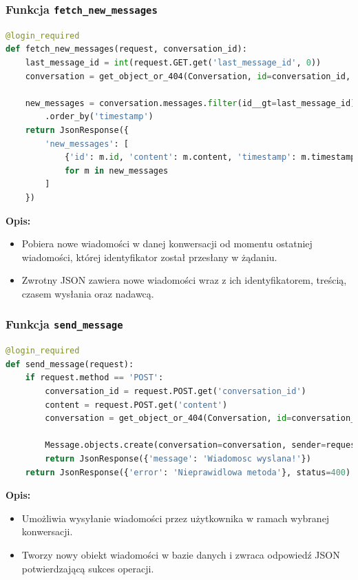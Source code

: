 \documentclass[12pt,a4paper,oneside]{article}
\theoremstyle{definition}
\numberwithin{equation}{section}
\begin{document}
\subsubsection{Funkcja \texttt{fetch\_new\_messages}}
\begin{lstlisting}[language=Python, caption=Funkcja \texttt{fetch\_new\_messages}]
@login_required
def fetch_new_messages(request, conversation_id):
    last_message_id = int(request.GET.get('last_message_id', 0))
    conversation = get_object_or_404(Conversation, id=conversation_id, participants=request.user)

    new_messages = conversation.messages.filter(id__gt=last_message_id)
        .order_by('timestamp')
    return JsonResponse({
        'new_messages': [
            {'id': m.id, 'content': m.content, 'timestamp': m.timestamp.strftime('%H:%M'), 'sender': m.sender.username}
            for m in new_messages
        ]
    })
\end{lstlisting}
\textbf{Opis:}
\begin{itemize}
    \item Pobiera nowe wiadomości w danej konwersacji od momentu ostatniej wiadomości, której identyfikator został przesłany w żądaniu.
    \item Zwrotny JSON zawiera nowe wiadomości wraz z ich identyfikatorem, treścią, czasem wysłania oraz nadawcą.
\end{itemize}



\subsubsection*{Funkcja \texttt{send\_message}}
\begin{lstlisting}[language=Python, caption=Funkcja \texttt{send\_message}]
@login_required
def send_message(request):
    if request.method == 'POST':
        conversation_id = request.POST.get('conversation_id')
        content = request.POST.get('content')
        conversation = get_object_or_404(Conversation, id=conversation_id, participants=request.user)

        Message.objects.create(conversation=conversation, sender=request.user, content=content.strip())
        return JsonResponse({'message': 'Wiadomosc wyslana!'})
    return JsonResponse({'error': 'Nieprawidlowa metoda'}, status=400)
\end{lstlisting}
\textbf{Opis:}
\begin{itemize}
    \item Umożliwia wysyłanie wiadomości przez użytkownika w ramach wybranej konwersacji.
    \item Tworzy nowy obiekt wiadomości w bazie danych i zwraca odpowiedź JSON potwierdzającą sukces operacji.
\end{itemize}
\end{document}
